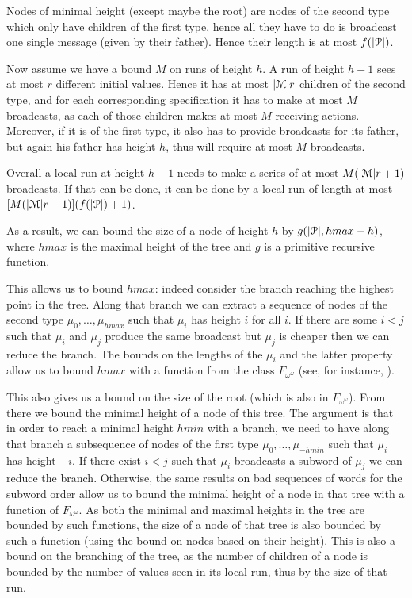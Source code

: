  Nodes of minimal height (except maybe the root) are nodes of the second type which only have children of the first type, hence all they have to do is broadcast one single message (given by their father). Hence their length is at most $f(|\mathcal{P}|)$. 
 
 Now assume we have a bound $M$ on runs of height $h$. A run of height $h-1$ sees at most $r$ different initial values. Hence it has at most $|\mathcal{M}|r$ children of the second type, and for each corresponding specification it has to make at most $M$ broadcasts, as each of those children makes at most $M$ receiving actions.
 Moreover, if it is of the first type, it also has to provide broadcasts for its father, but again his father has height $h$, thus will require at most $M$ broadcasts.
 
 Overall a local run at height $h-1$ needs to make a series of at most $M(|\mathcal{M}| r +1)$ broadcasts. If that can be done, it can be done by a local run of length at most $[M(|\mathcal{M}| r +1)](f(|\mathcal{P}|)+1)$.
 
 As a result, we can bound the size of a node of height $h$ by $g(|\mathcal{P}|, hmax-h)$, where $hmax$ is the maximal height of the tree and $g$ is a primitive recursive function.
 
 This allows us to bound $hmax$: indeed consider the branch reaching the highest point in the tree. Along that branch we can extract a sequence of nodes of the second type $\mu_0, \ldots, \mu_{hmax}$ such that $\mu_i$ has height $i$ for all $i$. If there are some $i<j$ such that $\mu_i$ and $\mu_j$ produce the same broadcast but $\mu_j$ is cheaper then we can reduce the branch.
 The bounds on the lengths of the $\mu_i$ and the latter property allow us to bound $hmax$ with a function from the class $F_{\omega^\omega}$ (see, for instance, \cite{SchmitzS2011upperHigman}).
 
 This also gives us a bound on the size of the root (which is also in $F_{\omega^\omega}$). From there we bound the minimal height of a node of this tree. The argument is that in order to reach a minimal height $hmin$ with a branch, we need to have along that branch a subsequence of nodes of the first type $\mu_0, \ldots, \mu_{-hmin}$ such that $\mu_i$ has height $-i$. If there exist $i<j$ such that $\mu_i$ broadcasts a subword of $\mu_j$ we can reduce the branch. Otherwise, the same results on bad sequences of words  for the subword order allow us to bound the minimal height of a node in that tree with a function of $F_{\omega^\omega}$.
 As both the minimal and maximal heights in the tree are bounded by such functions, the size of a node of that tree is also bounded by such a function (using the bound on nodes based on their height). This is also a bound on the branching of the tree, as the number of children of a node is bounded by the number of values seen in its local run, thus by the size of that run.
 
